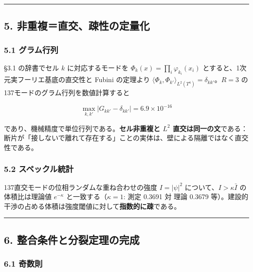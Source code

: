 \documentclass[
]{ltjsarticle}
\begin{document}
\begin{center}\rule{0.5\linewidth}{0.5pt}\end{center}

\subsection{5.
非重複＝直交、疎性の定量化}\label{ux975eux91cdux8907ux76f4ux4ea4ux758eux6027ux306eux5b9aux91cfux5316}

\subsubsection{5.1 グラム行列}\label{ux30b0ux30e9ux30e0ux884cux5217}

§3.1 の辞書でセル \(k\) に対応するモードを
\(\Phi_k(x)=\prod_i\varphi_{k_i}(x_i)\)
とすると、1次元実フーリエ基底の直交性と Fubini の定理より
\(\langle\Phi_k,\Phi_{k'}\rangle_{L^2(T^4)}=\delta_{kk'}\)。\(R=3\)
の137モードのグラム行列を数値計算すると

\[
\max_{k,k'}\bigl|G_{kk'}-\delta_{kk'}\bigr| = 6.9\times10^{-16}
\]

であり、機械精度で単位行列である。\textbf{セル非重複と \(L^2\)
直交は同一の文}である：断片が「接しないで離れて存在する」ことの実体は、壁による隔離ではなく直交性である。

\subsubsection{5.2
スペックル統計}\label{ux30b9ux30daux30c3ux30afux30ebux7d71ux8a08}

137直交モードの位相ランダムな重ね合わせの強度 \(I=|\psi|^2\)
について、\(I>\kappa\bar I\) の体積比は理論値 \(e^{-\kappa}\)
と一致する（\(\kappa=1\): 測定 0.3691 対 理論 0.3679
等）。建設的干渉の占める体積は強度閾値に対して\textbf{指数的に疎}である。

\begin{center}\rule{0.5\linewidth}{0.5pt}\end{center}

\subsection{6.
整合条件と分裂定理の完成}\label{ux6574ux5408ux6761ux4ef6ux3068ux5206ux88c2ux5b9aux7406ux306eux5b8cux6210}

\subsubsection{6.1 奇数則}\label{ux5947ux6570ux5247}
\end{document}
